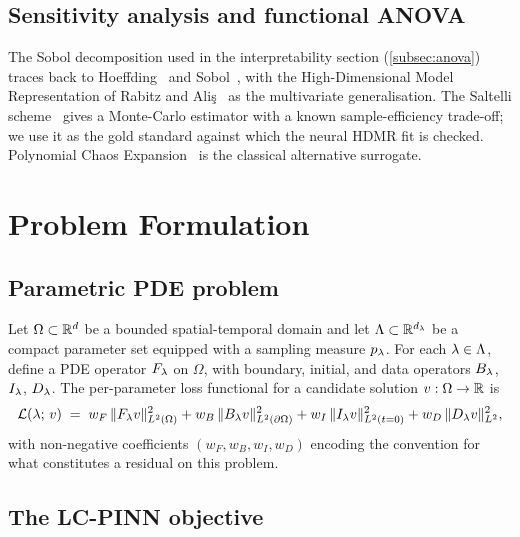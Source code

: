 \documentclass[12pt,a4paper]{extarticle}
\begin{document}
\subsection{Sensitivity analysis and functional ANOVA}

The Sobol decomposition used in the interpretability section (\ref{subsec:anova}) traces back to Hoeffding~\cite{hoeffding1948} and Sobol~\cite{sobol1993, sobol2001global}, with the High-Dimensional Model Representation of Rabitz and Ali\c{s}~\cite{rabitz1999general} as the multivariate generalisation. The Saltelli scheme~\cite{saltelli2010variance} gives a Monte-Carlo estimator with a known sample-efficiency trade-off; we use it as the gold standard against which the neural HDMR fit is checked. Polynomial Chaos Expansion~\cite{xiu2002wiener} is the classical alternative surrogate.

\newpage

\section{Problem Formulation}
\label{sec:problem}

\subsection{Parametric PDE problem}

Let $\Omega \subset \mathbb{R}^d$ be a bounded spatial-temporal domain and let $\Lambda \subset \mathbb{R}^{d_\lambda}$ be a compact parameter set equipped with a sampling measure $p_\lambda$. For each $\lambda \in \Lambda$, define a PDE operator $F_\lambda$ on $\Omega$, with boundary, initial, and data operators $B_\lambda$, $I_\lambda$, $D_\lambda$. The per-parameter loss functional for a candidate solution $v: \Omega \to \mathbb{R}$ is
\begin{equation}
    \mathcal{L}(\lambda;\, v) \;=\; w_F\, \|F_\lambda v\|_{L^2(\Omega)}^2 + w_B\, \|B_\lambda v\|_{L^2(\partial \Omega)}^2 + w_I\, \|I_\lambda v\|_{L^2(t=0)}^2 + w_D\, \|D_\lambda v\|_{L^2}^2,
    \label{eq:per-param-loss}
\end{equation}
with non-negative coefficients $(w_F, w_B, w_I, w_D)$ encoding the convention for what constitutes a residual on this problem.

\subsection{The LC-PINN objective}
\end{document}
